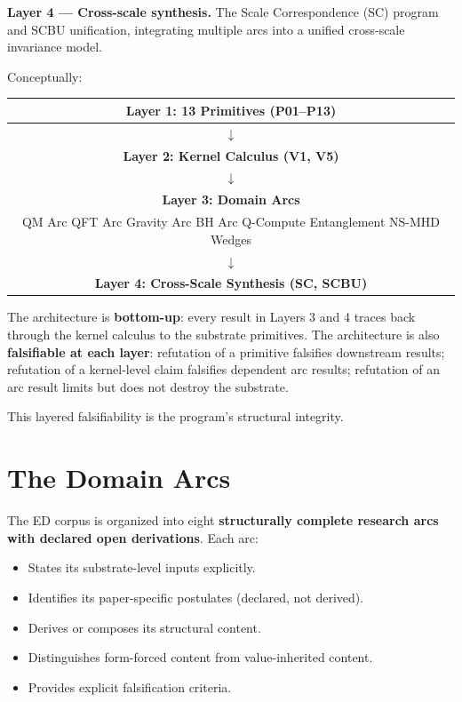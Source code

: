 \documentclass[11pt,a4paper]{article}
\begin{document}
\textbf{Layer 4 --- Cross-scale synthesis.} The Scale Correspondence (SC) program and SCBU unification, integrating multiple arcs into a unified cross-scale invariance model.

Conceptually:

\begin{center}
\begin{tabular}{c}
\hline
\textbf{Layer 1: 13 Primitives (P01--P13)} \\
\hline
$\downarrow$ \\
\hline
\textbf{Layer 2: Kernel Calculus (V1, V5)} \\
\hline
$\downarrow$ \\
\hline
\textbf{Layer 3: Domain Arcs} \\
QM Arc \quad QFT Arc \quad Gravity Arc \quad BH Arc \quad Q-Compute \quad Entanglement \quad NS-MHD \quad Wedges \\
\hline
$\downarrow$ \\
\hline
\textbf{Layer 4: Cross-Scale Synthesis (SC, SCBU)} \\
\hline
\end{tabular}
\end{center}

The architecture is \textbf{bottom-up}: every result in Layers 3 and 4 traces back through the kernel calculus to the substrate primitives. The architecture is also \textbf{falsifiable at each layer}: refutation of a primitive falsifies downstream results; refutation of a kernel-level claim falsifies dependent arc results; refutation of an arc result limits but does not destroy the substrate.

This layered falsifiability is the program's structural integrity.

\section{The Domain Arcs}

The ED corpus is organized into eight \textbf{structurally complete research arcs with declared open derivations}. Each arc:

\begin{itemize}[noitemsep]
\item States its substrate-level inputs explicitly.
\item Identifies its paper-specific postulates (declared, not derived).
\item Derives or composes its structural content.
\item Distinguishes form-forced content from value-inherited content.
\item Provides explicit falsification criteria.
\end{itemize}
\end{document}
